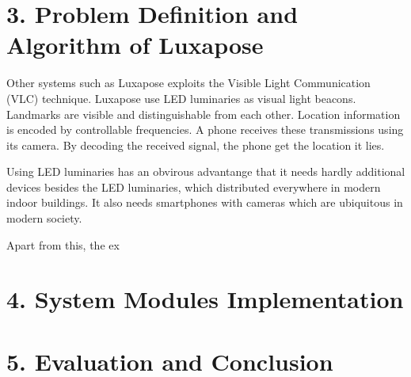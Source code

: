 \documentclass[a4paper, 11pt]{article} %
\begin{document}
\section*{3. Problem Definition and Algorithm of Luxapose}
Other systems such as Luxapose exploits the Visible Light Communication (VLC) technique. Luxapose use LED luminaries as visual light beacons. Landmarks are visible and distinguishable from each other. Location information is encoded by controllable frequencies. A phone receives these transmissions using its camera. By decoding the received signal, the phone get the location it lies.

Using LED luminaries has an obvirous advantange that it needs hardly additional devices besides the LED luminaries, which distributed everywhere in modern indoor buildings. It also needs smartphones with cameras which are ubiquitous in modern society.

Apart from this, the ex

\section*{4. System Modules Implementation}


\section*{5. Evaluation and Conclusion}

\end{document}
